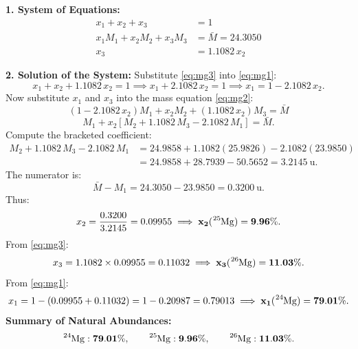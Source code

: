 \begin{tabletworkspace}[5.0cm]
\end{tabletworkspace}

\begin{solution}
\textbf{1. System of Equations:}
\begin{align}
x_1 + x_2 + x_3 &= 1 \label{eq:mg1} \\
x_1 M_1 + x_2 M_2 + x_3 M_3 &= \bar{M} = 24.3050 \label{eq:mg2} \\
x_3 &= 1.1082 \, x_2 \label{eq:mg3}
\end{align}

\textbf{2. Solution of the System:}
Substitute \eqref{eq:mg3} into \eqref{eq:mg1}:
\[
x_1 + x_2 + 1.1082 \, x_2 = 1 \implies x_1 + 2.1082 \, x_2 = 1 \implies x_1 = 1 - 2.1082 \, x_2.
\]
Now substitute $x_1$ and $x_3$ into the mass equation \eqref{eq:mg2}:
\[
(1 - 2.1082 \, x_2) M_1 + x_2 M_2 + (1.1082 \, x_2) M_3 = \bar{M}
\]
\[
M_1 + x_2 \left[ M_2 + 1.1082 \, M_3 - 2.1082 \, M_1 \right] = \bar{M}.
\]
Compute the bracketed coefficient:
\begin{align*}
M_2 + 1.1082 \, M_3 - 2.1082 \, M_1 &= 24.9858 + 1.1082(25.9826) - 2.1082(23.9850) \\
&= 24.9858 + 28.7939 - 50.5652 = 3.2145\ \mathrm{u}.
\end{align*}
The numerator is:
\[
\bar{M} - M_1 = 24.3050 - 23.9850 = 0.3200\ \mathrm{u}.
\]
Thus:
\[
x_2 = \frac{0.3200}{3.2145} = 0.09955 \implies \mathbf{x_2(\ce{^{25}Mg}) = 9.96\%}.
\]
From \eqref{eq:mg3}:
\[
x_3 = 1.1082 \times 0.09955 = 0.11032 \implies \mathbf{x_3(\ce{^{26}Mg}) = 11.03\%}.
\]
From \eqref{eq:mg1}:
\[
x_1 = 1 - (0.09955 + 0.11032) = 1 - 0.20987 = 0.79013 \implies \mathbf{x_1(\ce{^{24}Mg}) = 79.01\%}.
\]
\textbf{Summary of Natural Abundances:}
\[
\ce{^{24}Mg}: \mathbf{79.01\%}, \qquad \ce{^{25}Mg}: \mathbf{9.96\%}, \qquad \ce{^{26}Mg}: \mathbf{11.03\%}.
\]
\end{solution}

